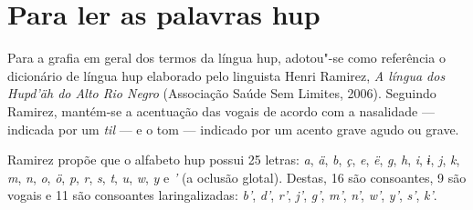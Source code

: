 \chapter{Para ler as palavras hup}

Para a grafia em geral dos termos da língua hup, adotou"-se como
referência o dicionário de língua hup elaborado pelo linguista Henri
Ramirez, \textit{A língua dos Hupd'äh do Alto Rio Negro} (Associação Saúde
Sem Limites, 2006). Seguindo Ramirez, mantém-se a acentuação
das vogais de acordo com a nasalidade --- indicada por um \textit{til} --- e o tom --- indicado por um acento grave agudo ou grave.

Ramirez propõe que o alfabeto hup possui 25 letras: \textit{a}, \textit{ä}, \textit{b}, \textit{ç}, \textit{e}, \textit{ë}, \textit{g},
\textit{h}, \textit{i}, \textit{ɨ}, \textit{j}, \textit{k}, \textit{m}, \textit{n}, \textit{o}, \textit{ö}, \textit{p}, \textit{r}, \textit{s}, \textit{t}, \textit{u}, \textit{w}, \textit{y} e \textit{'} (a oclusão
glotal). Destas, 16 são consoantes, 9 são vogais e 11 são consoantes
laringalizadas: \textit{b'}, \textit{d'}, \textit{r'}, \textit{j'}, \textit{g'}, \textit{m'}, \textit{n'}, \textit{w'}, \textit{y'}, \textit{s'}, \textit{k'}.



